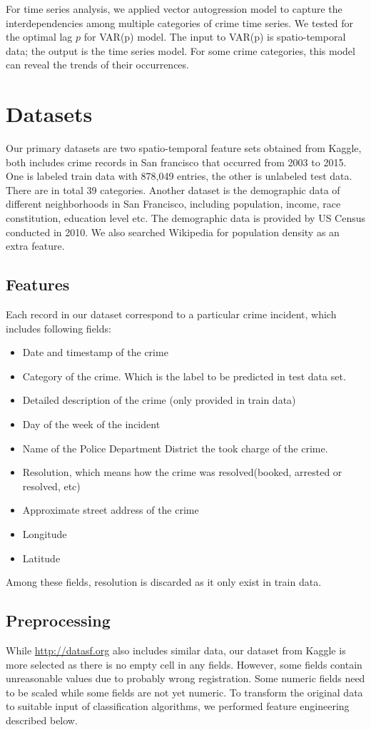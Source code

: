 \documentclass[11pt,conference]{IEEEtran}
\begin{document}
For time series analysis, we  applied vector autogression model to capture the interdependencies among multiple categories of crime time series. We tested for the optimal lag $p$ for VAR(p) model. The input to VAR(p) is spatio-temporal data; the output is the time series model. For some crime categories, this model can reveal the trends of their occurrences.

\section{Datasets}
Our primary datasets are two spatio-temporal feature sets obtained from Kaggle, both includes crime records in San francisco that occurred from 2003 to 2015. One is labeled train data with 878,049 entries, the other is unlabeled test data. There are in total 39 categories. Another dataset is the demographic data of different neighborhoods in San Francisco, including population, income, race constitution, education level etc. The demographic data is provided by US Census conducted in 2010. We also searched Wikipedia for population density as an extra feature. 
\subsection{Features}
Each record in our dataset correspond to a particular crime incident, which includes following fields:
\begin{itemize}
  \item Date and timestamp of the crime
  \item Category of the crime. Which is the label to be predicted in test data set.
  \item Detailed description of the crime (only provided in train data)
  \item Day of the week of the incident
  \item Name of the Police Department District the took charge of the crime.
  \item Resolution, which means how the crime was resolved(booked, arrested or resolved, etc)
  \item Approximate street address of the crime
  \item Longitude
  \item Latitude
\end{itemize}
Among these fields, resolution is discarded as it only exist in train data.
\subsection{Preprocessing}
While \url{http://datasf.org} also includes similar data, our dataset from Kaggle is more selected as there is no empty cell in any fields. However, some fields contain unreasonable values due to probably wrong registration. Some numeric fields need to be scaled while some fields are not yet numeric. To transform the original data to suitable input of classification algorithms, we performed feature engineering described below.
\end{document}
